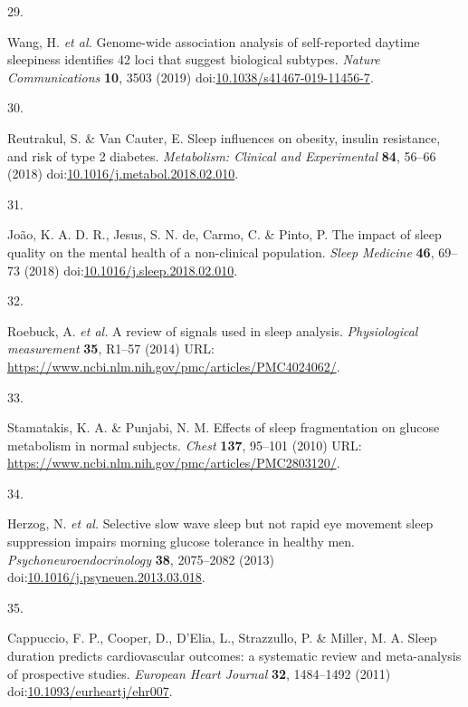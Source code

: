 \documentclass[
  10pt,
]{scrbook}
\newlength{\cslhangindent}
\newlength{\csllabelwidth}
\newlength{\cslentryspacingunit} %
\newenvironment{CSLReferences}[2] %
 {%
  \setlength{\parindent}{0pt}
  \ifodd #1
  \let\oldpar\par
  \def\par{\hangindent=\cslhangindent\oldpar}
  \fi
  \setlength{\parskip}{#2\cslentryspacingunit}
 }%
 {}
\newcommand{\CSLLeftMargin}[1]{\parbox[t]{\csllabelwidth}{#1}}
\newcommand{\CSLRightInline}[1]{\parbox[t]{\linewidth - \csllabelwidth}{#1}\break}
\let\originaltextbf\textbf
\renewcommand{\textbf}[1]{\textcolor{color1}{\originaltextbf{#1}}}
\begin{document}
\begin{CSLReferences}{0}{0}
\leavevmode{}%
\CSLLeftMargin{29. }%
\CSLRightInline{Wang, H. \emph{et al.} Genome-wide association analysis
of self-reported daytime sleepiness identifies 42 loci that suggest
biological subtypes. \emph{Nature Communications} \textbf{10}, 3503
(2019)
doi:\href{https://doi.org/10.1038/s41467-019-11456-7}{10.1038/s41467-019-11456-7}.}

\leavevmode{}%
\CSLLeftMargin{30. }%
\CSLRightInline{Reutrakul, S. \& Van Cauter, E. Sleep influences on
obesity, insulin resistance, and risk of type 2 diabetes.
\emph{Metabolism: Clinical and Experimental} \textbf{84}, 56--66 (2018)
doi:\href{https://doi.org/10.1016/j.metabol.2018.02.010}{10.1016/j.metabol.2018.02.010}.}

\leavevmode{}%
\CSLLeftMargin{31. }%
\CSLRightInline{João, K. A. D. R., Jesus, S. N. de, Carmo, C. \& Pinto,
P. The impact of sleep quality on the mental health of a non-clinical
population. \emph{Sleep Medicine} \textbf{46}, 69--73 (2018)
doi:\href{https://doi.org/10.1016/j.sleep.2018.02.010}{10.1016/j.sleep.2018.02.010}.}

\leavevmode{}%
\CSLLeftMargin{32. }%
\CSLRightInline{Roebuck, A. \emph{et al.} A review of signals used in
sleep analysis. \emph{Physiological measurement} \textbf{35}, R1--57
(2014) URL:
\url{https://www.ncbi.nlm.nih.gov/pmc/articles/PMC4024062/}.}

\leavevmode{}%
\CSLLeftMargin{33. }%
\CSLRightInline{Stamatakis, K. A. \& Punjabi, N. M. Effects of sleep
fragmentation on glucose metabolism in normal subjects. \emph{Chest}
\textbf{137}, 95--101 (2010) URL:
\url{https://www.ncbi.nlm.nih.gov/pmc/articles/PMC2803120/}.}

\leavevmode{}%
\CSLLeftMargin{34. }%
\CSLRightInline{Herzog, N. \emph{et al.} Selective slow wave sleep but
not rapid eye movement sleep suppression impairs morning glucose
tolerance in healthy men. \emph{Psychoneuroendocrinology} \textbf{38},
2075--2082 (2013)
doi:\href{https://doi.org/10.1016/j.psyneuen.2013.03.018}{10.1016/j.psyneuen.2013.03.018}.}

\leavevmode{}%
\CSLLeftMargin{35. }%
\CSLRightInline{Cappuccio, F. P., Cooper, D., D'Elia, L., Strazzullo, P.
\& Miller, M. A. Sleep duration predicts cardiovascular outcomes: a
systematic review and meta-analysis of prospective studies.
\emph{European Heart Journal} \textbf{32}, 1484--1492 (2011)
doi:\href{https://doi.org/10.1093/eurheartj/ehr007}{10.1093/eurheartj/ehr007}.}


\end{CSLReferences}
\end{document}

